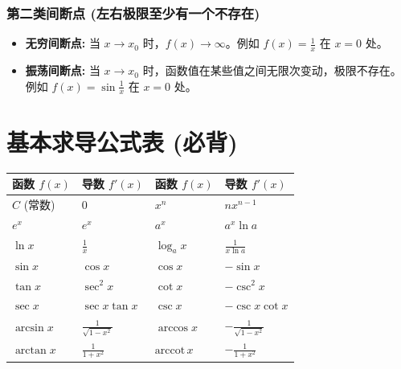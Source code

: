 \documentclass{article}
\begin{document}
\subsubsection{第二类间断点 (左右极限至少有一个不存在)}
\begin{itemize}[leftmargin=1.5em]
    \item \textbf{无穷间断点:} 当 $x \to x_0$ 时，$f(x) \to \infty$。例如 $f(x) = \frac{1}{x}$ 在 $x = 0$ 处。
    \item \textbf{振荡间断点:} 当 $x \to x_0$ 时，函数值在某些值之间无限次变动，极限不存在。例如 $f(x) = \sin\frac{1}{x}$ 在 $x = 0$ 处。
\end{itemize}
\section{基本求导公式表 (必背)}
\begin{table}[h]
\centering\small
\begin{tabular}{ll|ll}
\toprule
\textbf{函数 $f(x)$} & \textbf{导数 $f'(x)$} & \textbf{函数 $f(x)$} & \textbf{导数 $f'(x)$} \\
\midrule
$C$ (常数) & $0$ & $x^n$ & $n x^{n-1}$ \\
$e^x$ & $e^x$ & $a^x$ & $a^x \ln a$ \\
$\ln x$ & $\frac{1}{x}$ & $\log_a x$ & $\frac{1}{x \ln a}$ \\
\midrule
$\sin x$ & $\cos x$ & $\cos x$ & $-\sin x$ \\
$\tan x$ & $\sec^2 x$ & $\cot x$ & $-\csc^2 x$ \\
$\sec x$ & $\sec x \tan x$ & $\csc x$ & $-\csc x \cot x$ \\
\midrule
$\arcsin x$ & $\frac{1}{\sqrt{1-x^2}}$ & $\arccos x$ & $-\frac{1}{\sqrt{1-x^2}}$ \\
$\arctan x$ & $\frac{1}{1+x^2}$ & $\text{arccot}\,x$ & $-\frac{1}{1+x^2}$ \\
\bottomrule
\end{tabular}
\end{table}
\end{document}
